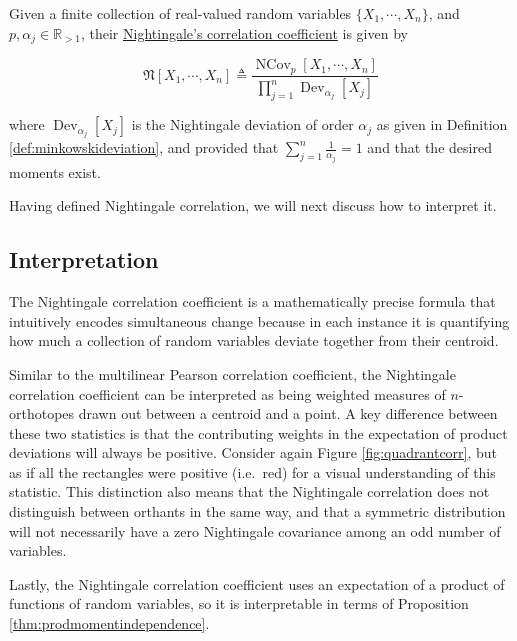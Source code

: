 \documentclass[
  letterpaper,
  DIV=11,
  numbers=noendperiod]{scrreprt}
\begin{document}
\begin{Definition}[mydefinition=Nightingale's Correlation Coefficient, label=def:nightingalecorrelation]
Given a finite collection of real-valued random variables $\{X_1, \cdots, X_n\}$,  and $p, \alpha_j \in \mathbb{R}_{>1}$, their \underline{Nightingale's correlation coefficient} is given by

$$\mathfrak{N} \left[ X_1, \cdots, X_n \right] \triangleq \frac{\operatorname{NCov}_p\left[ X_1, \cdots, X_n \right]}{\prod_{j=1}^{n} \operatorname{Dev}_{\alpha_j}[X_j]}$$

where $\operatorname{Dev}_{\alpha_j}[X_j]$ is the Nightingale deviation of order $\alpha_j$ as given in Definition \ref{def:minkowskideviation}, and provided that $\sum_{j=1}^{n} \frac{1}{\alpha_j} = 1$ and that the desired moments exist.
\end{Definition}

Having defined Nightingale correlation, we will next discuss how to
interpret it.

\subsection{Interpretation}\label{interpretation-1}

The Nightingale correlation coefficient is a mathematically precise
formula that intuitively encodes simultaneous change because in each
instance it is quantifying how much a collection of random variables
deviate together from their centroid.

Similar to the multilinear Pearson correlation coefficient, the
Nightingale correlation coefficient can be interpreted as being weighted
measures of \(n\)-orthotopes drawn out between a centroid and a point. A
key difference between these two statistics is that the contributing
weights in the expectation of product deviations will always be
positive. Consider again Figure \ref{fig:quadrantcorr}, but as if all
the rectangles were positive (i.e.~red) for a visual understanding of
this statistic. This distinction also means that the Nightingale
correlation does not distinguish between orthants in the same way, and
that a symmetric distribution will not necessarily have a zero
Nightingale covariance among an odd number of variables.

Lastly, the Nightingale correlation coefficient uses an expectation of a
product of functions of random variables, so it is interpretable in
terms of Proposition \ref{thm:prodmomentindependence}.
\end{document}
